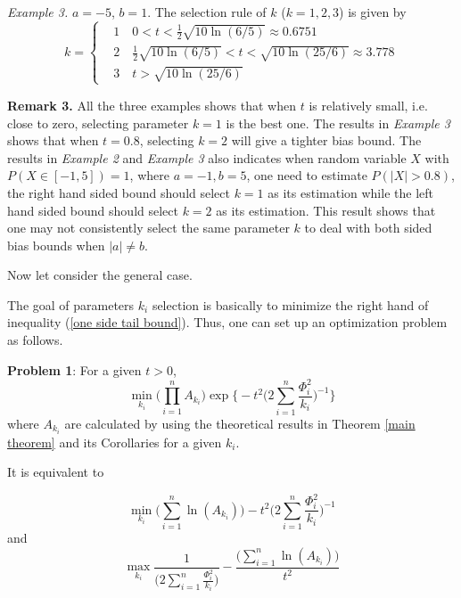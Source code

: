 \documentclass[journal]{IEEEtran}
\begin{document}
 \emph{Example 3.} $a= -5$, $b=1$.  The selection  rule of $k$ ($k=1,2,3$) is given by
\begin{equation}
k=
\begin{cases}
{}&1 \quad 0<t< \frac{1}{2}\sqrt{10\ln(6/5)}\approx 0.6751 {} \\
 & 2 \quad  \frac{1}{2}\sqrt{10\ln(6/5)} <t< \sqrt{10\ln (25/6)}\approx 3.778 \\
 & 3 \quad  t > \sqrt{10\ln (25/6)}
\end{cases}
\end{equation}

\textbf{Remark 3.}
All the three examples shows that when $t$ is relatively small, i.e. close to zero, selecting parameter $k=1$ is the best one. The results in \emph{Example 3} shows that when $t=0.8$, selecting $k=2$ will give a tighter bias bound.  The results in \emph{Example 2} and \emph{Example 3} also indicates when random variable $X$ with $P(X\in [-1,5])=1$, where $a=-1, b=5$, one need to estimate $P(|X|> 0.8)$, the right hand sided bound should select $k=1$ as its estimation while the left hand sided bound should select $k=2$ as its estimation. This result shows that one may not consistently select the same parameter $k$  to deal with both sided bias bounds when  $|a|\neq b$.

Now let consider the general case.

The goal of parameters $k_i$ selection is basically to minimize the right hand of inequality (\ref{one side tail bound}). Thus, one can set up an optimization problem as follows.

\textbf{Problem 1}:
For a given $t>0$,
\begin{equation}
\min\limits_{k_i}\Big(\prod_{i=1}^n A_{k_i}\Big)\exp\Big\{-t^2\Big(2\sum_{i=1}^n \frac{\Phi_i^2}{k_i}\Big)^{-1}\Big\}
\end{equation}
where $A_{k_i}$ are calculated by using the theoretical results in Theorem \ref{main theorem} and its Corollaries for a given $k_i$.

It is equivalent to

\begin{equation}
\min\limits_{k_i}\Big(\sum_{i=1}^n \ln(A_{k_i})\Big)-t^2\Big(2\sum_{i=1}^n \frac{\Phi_i^2}{k_i}\Big)^{-1}
\end{equation}
and
\begin{equation}
\max\limits_{k_i}\frac{1}{\Big(2\sum_{i=1}^n \frac{\Phi_i^2}{k_i}\Big)}-\frac{\Big(\sum_{i=1}^n \ln(A_{k_i})\Big)}{t^2}
\end{equation}
\end{document}

